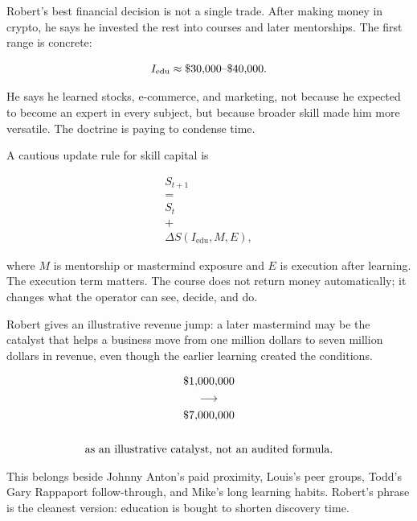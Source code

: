 \documentclass[11pt,oneside]{book}
\begin{document}
Robert's best financial decision is not a single trade. After making money in crypto, he says he invested the rest into courses and later mentorships. The first range is concrete:

\begin{equation}
I_{\mathrm{edu}}\approx \$30{,}000\hbox{--}\$40{,}000.
\end{equation}

He says he learned stocks, e-commerce, and marketing, not because he expected to become an expert in every subject, but because broader skill made him more versatile. The doctrine is paying to condense time.

A cautious update rule for skill capital is

\begin{equation}
\begin{gathered}
S_{t+1}\\
=\\
S_t\\
+\\
\Delta S(I_{\mathrm{edu}},M,E),
\end{gathered}
\end{equation}

where \(M\) is mentorship or mastermind exposure and \(E\) is execution after learning. The execution term matters. The course does not return money automatically; it changes what the operator can see, decide, and do.

Robert gives an illustrative revenue jump: a later mastermind may be the catalyst that helps a business move from one million dollars to seven million dollars in revenue, even though the earlier learning created the conditions.

\begin{equation}
\begin{gathered}
\$1{,}000{,}000\\
\longrightarrow\\
\$7{,}000{,}000\\
\quad\\
\hbox{as an illustrative catalyst, not an audited formula.}
\end{gathered}
\end{equation}

This belongs beside Johnny Anton's paid proximity, Louis's peer groups, Todd's Gary Rappaport follow-through, and Mike's long learning habits. Robert's phrase is the cleanest version: education is bought to shorten discovery time.
\end{document}
